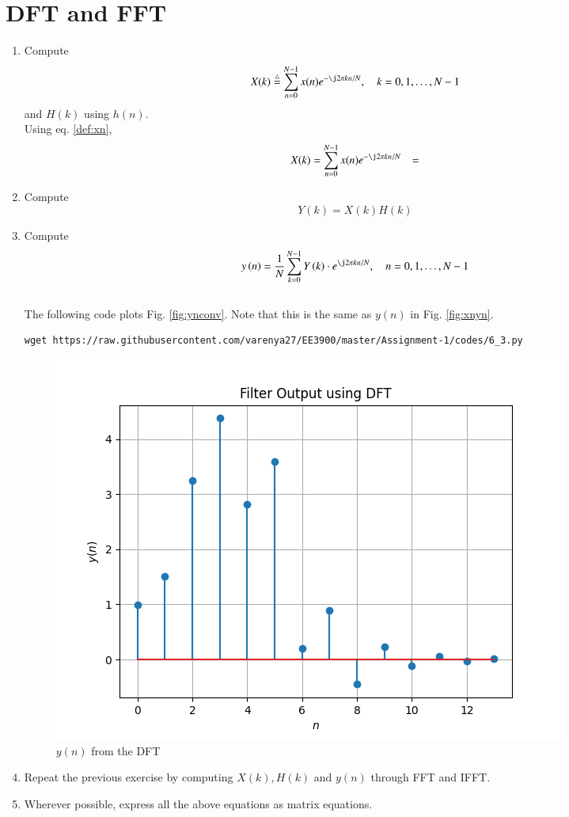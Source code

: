 \documentclass[journal,12pt,twocolumn]{IEEEtran}
\renewcommand\thesection{\arabic{section}}
\begin{document}
\section{DFT and FFT}
\begin{enumerate}[label=\thesection.\arabic*]
\item
Compute
\begin{equation}
X(k) \define \sum _{n=0}^{N-1}x(n) e^{-\j2\pi kn/N}, \quad k = 0,1,\dots, N-1
\end{equation}
and $H(k)$ using $h(n)$.\\
\solution Using eq. \eqref{def:xn},
\begin{align}
    X(k) &= \sum _{n=0}^{N-1}x(n) e^{-\j2\pi kn/N}
    &= 
\end{align}
\item Compute 
\begin{equation}
Y(k) = X(k)H(k)
\end{equation}
\item Compute
\begin{equation}
 y\brak{n}={\frac {1}{N}}\sum _{k=0}^{N-1}Y\brak{k}\cdot e^{\j 2\pi kn/N},\quad n = 0,1,\dots, N-1
\end{equation}
\\
\solution The following code plots Fig. \ref{fig:ynconv}. Note that this is the same as 
$y(n)$ in  Fig. 
\ref{fig:xnyn}. 
%
\begin{lstlisting}
wget https://raw.githubusercontent.com/varenya27/EE3900/master/Assignment-1/codes/6_3.py
\end{lstlisting}
\begin{figure}[!ht]
\centering
\includegraphics[width=\columnwidth]{figures/Figure_6.png}
\caption{$y(n)$ from the DFT}
\label{fig:yndft}
\end{figure}

\item Repeat the previous exercise by computing $X(k), H(k)$ and $y(n)$ through FFT and 
IFFT.
\item Wherever possible, express all the above equations as matrix equations.
\end{enumerate}
%
\end{document}
